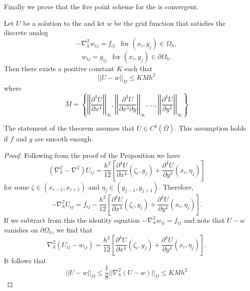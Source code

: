 Finally we prove that the five point scheme for the  is convergent.
\begin{theorem}
Let $U$ be a solution to the  and let $w$ be the grid function
that satisfies the discrete analog
\[-\nabla_h^2w_{ij}=f_{ij} \ \ \mbox{ for } (x_i,y_j)\in\Omega_h, \]
\[w_{ij}=g_{ij} \ \ \mbox{ for } (x_i,y_j)\in\partial\Omega_h. \]
Then there exists a positive constant $K$ such that
\[||U-w||_{\Omega}\leq KMh^2 \]
where
\[ M=\left\{
\left|\left|\frac{\partial^4 U}{\partial x^4} \right|\right|_{\infty},
\left|\left|\frac{\partial^4 U}{\partial x^3\partial y} \right|\right|_{\infty},
...,
\left|\left|\frac{\partial^4 U}{\partial y^4} \right|\right|_{\infty}
 \right\}
\]
\end{theorem}
The statement of the theorem assumes that $U\in C^4(\bar{\Omega})$. This assumption
holds if $f$ and $g$ are smooth enough.
\begin{proof}
Following from the proof of the Proposition we have
\[ (\nabla_h^2-\nabla^2)U_{ij}=\frac{h^2}{12}\left[ \frac{\partial^4 U}{\partial x^4}(\zeta_i,y_j)+\frac{\partial^4 U}{\partial y^4}(x_i,\eta_j) \right]\]
for some $\zeta \in (x_{i-1},x_{i+1})$ and $\eta_j\in(y_{j-1},y_{j+1})$.  Therefore,
\[ -\nabla_h^2U_{ij}=f_{ij}-\frac{h^2}{12}\left[ \frac{\partial^4 U}{\partial x^4}(\zeta_i,y_j)+\frac{\partial^4 U}{\partial y^4}(x_i,\eta_j) \right].\]
If we subtract from this the identity equation $-\nabla_h^2w_{ij}=f_{ij}$ and note
that $U-w$ vanishes on $\partial\Omega_h$, we find that
\[ \nabla_h^2(U_{ij}-w_{ij})=\frac{h^2}{12}\left[ \frac{\partial^4 U}{\partial x^4}(\zeta_i,y_j)+\frac{\partial^4 U}{\partial y^4}(x_i,\eta_j) \right].\]
It follows that
\[ ||U-w||_{\Omega}\leq\frac{1}{8}||\nabla_h^2(U-w)||_{\Omega}\leq KMh^2\]
\end{proof}